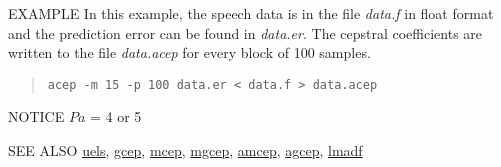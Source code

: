 \begin{qsection}{EXAMPLE}
        In this example, the speech data is in the file {\em data.f} in
        float format and the prediction error can be found in
        {\em data.er}. The cepstral coefficients are written to the file
        {\em data.acep} for every block of 100 samples.
 \begin{quote}
	\verb!acep -m 15 -p 100 data.er < data.f > data.acep!
 \end{quote} 
\end{qsection}

\begin{qsection}{NOTICE}
$Pa$ = 4 or 5
\end{qsection}

\begin{qsection}{SEE ALSO}
\hyperlink{uels}{uels}, 
\hyperlink{gcep}{gcep}, 
\hyperlink{mcep}{mcep}, 
\hyperlink{mgcep}{mgcep},
\hyperlink{amcep}{amcep},
\hyperlink{agcep}{agcep},
\hyperlink{lmadf}{lmadf}
\end{qsection}
